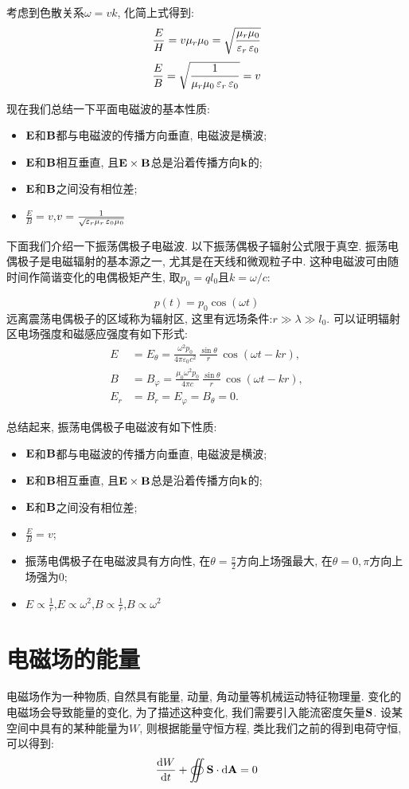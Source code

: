 考虑到色散关系$\omega = vk$, 化简上式得到:
\[
\frac{E}{H} = v\mu_r\mu_0 = \sqrt{\frac{\mu_r\mu_0}{\mathop{}\!\varepsilon_r\mathop{}\!\varepsilon_0}}
\]
\[
\frac{E}{B} =  \sqrt{\frac{1}{\mu_r\mu_0\mathop{}\!\varepsilon_r\mathop{}\!\varepsilon_0}} = v
\]

现在我们总结一下平面电磁波的基本性质:
\begin{itemize}
  \item $\mathbf{E}$和$\mathbf{B}$都与电磁波的传播方向垂直, 电磁波是横波;
  \item $\mathbf{E}$和$\mathbf{B}$相互垂直, 且$\mathbf{E}\times\mathbf{B}$总是沿着传播方向$\mathbf{k}$的;
  \item $\mathbf{E}$和$\mathbf{B}$之间没有相位差;
  \item $\frac{E}{B}=v$,$v=\frac{1}{\sqrt{\mathop{}\!\varepsilon_r\mu_r\mathop{}\!\varepsilon_0\mu_0}}$
\end{itemize}


下面我们介绍一下振荡偶极子电磁波. 以下振荡偶极子辐射公式限于真空. 振荡电偶极子是电磁辐射的基本源之一, 尤其是在天线和微观粒子中. 这种电磁波可由随时间作简谐变化的电偶极矩产生, 取$p_0=ql_0$且$k=\omega/c$:

\[
p(t) = p_0\cos(\omega t)
\]
远离震荡电偶极子的区域称为辐射区, 这里有远场条件:$r\gg\lambda\gg l_0$. 可以证明辐射区电场强度和磁感应强度有如下形式:
\begin{align*}
E &= E_\theta = \frac{\omega^2 p_0}{4\pi\varepsilon_0c^2}\,
\frac{\sin\theta}{r}\,
\cos(\omega t - kr), \\[6pt]
B &= B_\varphi = \frac{\mu_0 \omega^2 p_0}{4\pi c}\,
\frac{\sin\theta}{r}\,
\cos(\omega t - kr), \\[6pt]
E_r &= B_r = E_\varphi = B_\theta  = 0.
\end{align*}

总结起来, 振荡电偶极子电磁波有如下性质:
\begin{itemize}
  \item $\mathbf{E}$和$\mathbf{B}$都与电磁波的传播方向垂直, 电磁波是横波;
  \item $\mathbf{E}$和$\mathbf{B}$相互垂直, 且$\mathbf{E}\times\mathbf{B}$总是沿着传播方向$\mathbf{k}$的;
  \item $\mathbf{E}$和$\mathbf{B}$之间没有相位差;
  \item $\frac{E}{B}=v$;
  \item 振荡电偶极子在电磁波具有方向性, 在$\theta=\frac{\pi}{2}$方向上场强最大, 在$\theta = 0,\pi$方向上场强为$0$;
  \item $E\propto \frac{1}{r}$,$E\propto \omega^2$,$B\propto \frac{1}{r}$,$B\propto \omega^2$
\end{itemize}

\section{电磁场的能量}
电磁场作为一种物质, 自然具有能量, 动量, 角动量等机械运动特征物理量. 变化的电磁场会导致能量的变化, 为了描述这种变化, 我们需要引入能流密度矢量$\mathbf{S}$. 设某空间中具有的某种能量为$W$, 则根据能量守恒方程, 类比我们之前的得到电荷守恒, 可以得到:
\[
\frac{\mathop{}\!\mathrm{d} W}{\mathop{}\!\mathrm{d} t} + \oiint \mathbf{S} \cdot \mathop{}\!\mathrm{d} \mathbf{A} = 0
\]

